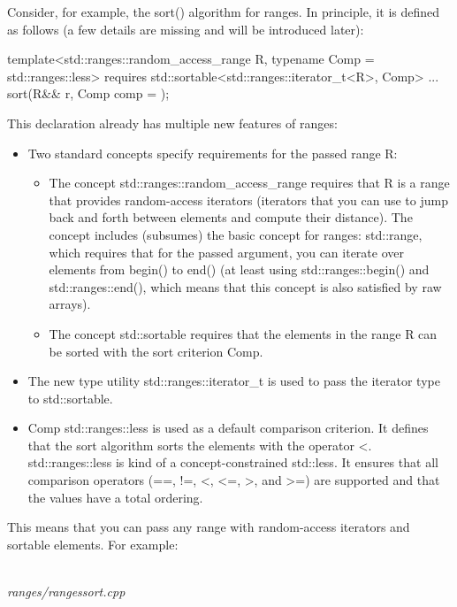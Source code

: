 Consider, for example, the sort() algorithm for ranges. In principle, it is defined as follows (a few details are missing and will be introduced later):

\begin{cpp}
template<std::ranges::random_access_range R,
		typename Comp = std::ranges::less>
requires std::sortable<std::ranges::iterator_t<R>, Comp>
... sort(R&& r, Comp comp = {});
\end{cpp}

This declaration already has multiple new features of ranges:

\begin{itemize}
\item
Two standard concepts specify requirements for the passed range R:

\begin{itemize}
\item
The concept std::ranges::random\_access\_range requires that R is a range that provides random-access iterators (iterators that you can use to jump back and forth between elements and compute their distance). The concept includes (subsumes) the basic concept for ranges: std::range, which requires that for the passed argument, you can iterate over elements from begin() to end() (at least using std::ranges::begin() and std::ranges::end(), which means that this concept is also satisfied by raw arrays).

\item
The concept std::sortable requires that the elements in the range R can be sorted with the sort criterion Comp.
\end{itemize}

\item
The new type utility std::ranges::iterator\_t is used to pass the iterator type to std::sortable.

\item
Comp std::ranges::less is used as a default comparison criterion. It defines that the sort algorithm sorts the elements with the operator <. std::ranges::less is kind of a concept-constrained std::less. It ensures that all comparison operators (==, !=, <, <=, >, and >=) are supported and that the values have a total ordering.
\end{itemize}

This means that you can pass any range with random-access iterators and sortable elements. For example:

\noindent
\hspace*{\fill} \\ %
\textit{ranges/rangessort.cpp}

